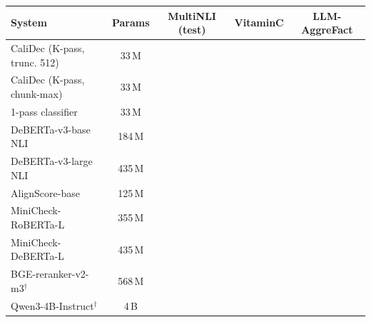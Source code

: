 \begin{tabular}{lcccc}
\toprule
\textbf{System} & \textbf{Params} & \textbf{MultiNLI (test)} & \textbf{VitaminC} & \textbf{LLM-AggreFact} \\
\midrule
CaliDec (K-pass, trunc. 512) & 33\,M & \ph{--} & \ph{--} & \ph{--} \\
CaliDec (K-pass, chunk-max) & 33\,M & \ph{--} & \ph{--} & \ph{--} \\
1-pass classifier & 33\,M & \ph{--} & \ph{--} & \ph{--} \\
DeBERTa-v3-base NLI & 184\,M & \ph{--} & \ph{--} & \ph{--} \\
DeBERTa-v3-large NLI & 435\,M & \ph{--} & \ph{--} & \ph{--} \\
AlignScore-base & 125\,M & \ph{--} & \ph{--} & \ph{--} \\
MiniCheck-RoBERTa-L & 355\,M & \ph{--} & \ph{--} & \ph{--} \\
MiniCheck-DeBERTa-L & 435\,M & \ph{--} & \ph{--} & \ph{--} \\
BGE-reranker-v2-m3$^\dagger$ & 568\,M & \ph{--} & \ph{--} & \ph{--} \\
Qwen3-4B-Instruct$^\dagger$ & 4\,B & \ph{--} & \ph{--} & \ph{--} \\
\bottomrule
\end{tabular}
